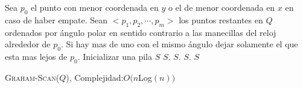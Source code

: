       


  \BlankLine
	Sea $p_0$ el punto con menor coordenada en $y$ o el de menor coordenada en $x$ en caso de haber empate.\;
	Sean $<p_1,p_2,\cdots ,p_m>$ los puntos restantes en $Q$ ordenados por \'angulo polar en sentido contrario a las manecillas del reloj alrededor de $p_0$. Si hay mas de uno con el mismo \'angulo dejar solamente el que esta mas lejos de $p_0$.\;
	Inicializar una pila $S$\;	
	$S.$\;
	$S.$\;
	$S.$\;
	\Return $S$\;
	\caption{\textsc{Graham-Scan}($Q$), Complejidad:$O(n$Log$(n))$}